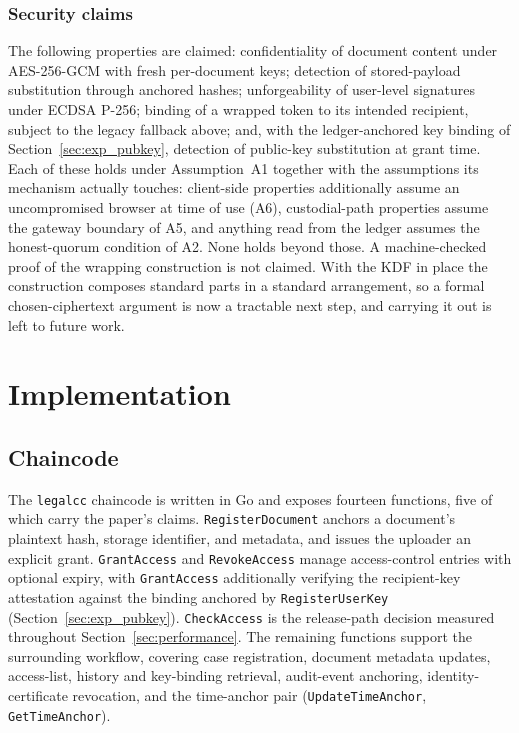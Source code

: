 \documentclass[preprint,12pt]{elsarticle}
\begin{document}
\subsubsection{Security claims}
\label{sec:cryptoclaims}
The following properties are claimed: confidentiality of document content
under AES-256-GCM with fresh per-document keys; detection of stored-payload
substitution through anchored hashes; unforgeability of user-level signatures
under ECDSA P-256; binding of a wrapped token to its intended recipient,
subject to the legacy fallback above; and, with the ledger-anchored key binding
of Section~\ref{sec:exp_pubkey}, detection of public-key substitution at grant
time. Each of these holds under Assumption~A1 together with the assumptions its
mechanism actually touches: client-side properties additionally assume an
uncompromised browser at time of use (A6), custodial-path properties assume
the gateway boundary of A5, and anything read from the ledger assumes the
honest-quorum condition of A2. None holds beyond those. A machine-checked proof of
the wrapping construction is not claimed. With the KDF in place the
construction composes standard parts in a standard arrangement, so a formal
chosen-ciphertext argument is now a tractable next step, and carrying it out is
left to future work.


\section{Implementation}
\label{sec:implementation}

\subsection{Chaincode}
\label{sec:chaincode}

The \texttt{legalcc} chaincode is written in Go and exposes fourteen
functions, five of which carry the paper's claims. \texttt{RegisterDocument}
anchors a document's plaintext hash, storage identifier, and metadata, and
issues the uploader an explicit grant. \texttt{GrantAccess} and
\texttt{RevokeAccess} manage access-control entries with optional expiry,
with \texttt{GrantAccess} additionally verifying the recipient-key
attestation against the binding anchored by \texttt{RegisterUserKey}
(Section~\ref{sec:exp_pubkey}). \texttt{CheckAccess} is the release-path
decision measured throughout Section~\ref{sec:performance}. The remaining
functions support the surrounding workflow, covering case registration,
document metadata updates, access-list, history and key-binding retrieval,
audit-event anchoring, identity-certificate revocation, and the time-anchor
pair (\texttt{UpdateTimeAnchor}, \texttt{GetTimeAnchor}).
\end{document}
